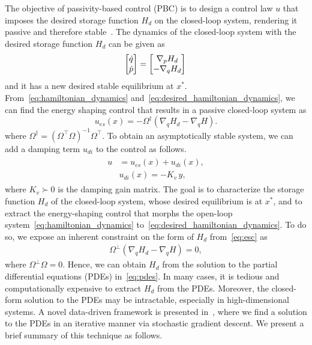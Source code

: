 The objective of passivity-based control (PBC) is to design a control law $u$
that imposes the desired storage function $H_d$ on the closed-loop system,
rendering it passive and therefore stable~\cite{van2000l2}.
%
The dynamics of the closed-loop system with the desired storage function $H_d$ can be given as
\begin{align}
  \begin{split}  
    \begin{bmatrix}\dot{q} \\ \dot{p}\end{bmatrix} &= \begin{bmatrix}\nabla_pH_d \\ -\nabla_qH_d\end{bmatrix}\, \\
  \end{split}
  \label{eq:desired_hamiltonian_dynamics}
\end{align}
\noindent and it has a new desired stable equilibrium at $x^*$.
%
From~\eqref{eq:hamiltonian_dynamics}
and~\eqref{eq:desired_hamiltonian_dynamics}, we can find the energy shaping
control that results in a passive closed-loop system as
%
\begin{equation}
  u_{es}(x) =  -\Omega^{\dagger} \left( \nabla_q H_d - \nabla_q H \right).
  \label{eq:esc}
\end{equation}
\noindent where $\Omega^\dagger = \left( \Omega^\top \Omega  \right)^{-1}
\Omega^\top$. To obtain an asymptotically stable system, we can add a
damping term $u_{di}$ to the control as follows.
\begin{align}
  \begin{split} 
    u &= u_{es}(x) + u_{di}(x), \\
    &u_{di}(x) = - K_{v} \, y,
  \end{split}
  \label{eq:damping_and_es_control}
\end{align}
\noindent where $K_v \succ 0$ is the damping gain matrix.
%
The goal is to characterize the storage function $H_d$ of the closed-loop
system, whose desired equilibrium is at $x^*$, and to extract the energy-shaping
control that morphs the open-loop system~\eqref{eq:hamiltonian_dynamics}
to~\eqref{eq:desired_hamiltonian_dynamics}.
%
To do so, we expose an inherent constraint on the form of $H_d$ from~\eqref{eq:esc} as
\begin{align}
  \Omega^\bot \left( \nabla_q H_d - \nabla_q H \right) = 0,
    \label{eq:pdes}
\end{align}
where $\Omega^\perp \Omega = 0$. 
%
Hence, we can obtain $H_d$ from the solution to the partial differential
equations (PDEs) in~\eqref{eq:pdes}.
%
In many cases, it is tedious and computationally expensive to extract $H_d$ from
the PDEs. Moreover, the closed-form solution to the PDEs may be intractable,
especially in high-dimensional systems.
%
A novel data-driven framework is presented in~\cite{ashenafi2022robust,
sirichotiyakul2022data, acc}, where we find a solution to the PDEs in an
iterative manner via stochastic gradient descent.
%
We present a brief summary of this technique as follows.

